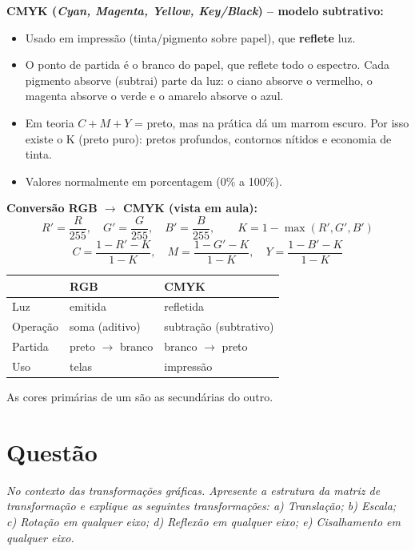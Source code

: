 \documentclass{article}
\newcounter{questao}
\newcommand{\questao}[1]{%
      \stepcounter{questao}%
      \section*{Questão \arabic{questao}}%
      \textit{#1}\par\medskip}
\begin{document}
\textbf{CMYK (\textit{Cyan, Magenta, Yellow, Key/Black}) -- modelo subtrativo:}
\begin{itemize}
      \item Usado em impressão (tinta/pigmento sobre papel), que \textbf{reflete} luz.
      \item O ponto de partida é o branco do papel, que reflete todo o espectro. Cada pigmento absorve (subtrai) parte da luz: o ciano absorve o vermelho, o magenta absorve o verde e o amarelo absorve o azul.
      \item Em teoria $C+M+Y$ = preto, mas na prática dá um marrom escuro. Por isso existe o K (preto puro): pretos profundos, contornos nítidos e economia de tinta.
      \item Valores normalmente em porcentagem (0\% a 100\%).
\end{itemize}

\textbf{Conversão RGB $\rightarrow$ CMYK (vista em aula):}
\[
      R' = \frac{R}{255},\quad G' = \frac{G}{255},\quad B' = \frac{B}{255},\qquad
      K = 1 - \max(R', G', B')
\]
\[
      C = \frac{1 - R' - K}{1 - K},\quad
      M = \frac{1 - G' - K}{1 - K},\quad
      Y = \frac{1 - B' - K}{1 - K}
\]

\begin{center}
      \begin{tabular}{@{}lll@{}}
            \toprule
                         & \textbf{RGB}           & \textbf{CMYK}            \\
            \midrule
            Luz          & emitida                & refletida                \\
            Operação     & soma (aditivo)         & subtração (subtrativo)   \\
            Partida      & preto $\to$ branco     & branco $\to$ preto       \\
            Uso          & telas                  & impressão                \\
            \bottomrule
      \end{tabular}
\end{center}

As cores primárias de um são as secundárias do outro.

\questao{No contexto das transformações gráficas. Apresente a estrutura da matriz de transformação e explique as seguintes transformações: a) Translação; b) Escala; c) Rotação em qualquer eixo; d) Reflexão em qualquer eixo; e) Cisalhamento em qualquer eixo.}
\end{document}
